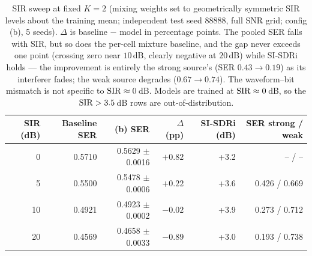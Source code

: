 \begin{table}[H]
\centering
\caption{SIR sweep at fixed $K{=}2$ (mixing weights set to geometrically symmetric SIR levels about the training mean; independent test seed 88888, full SNR grid; config (b), 5 seeds). $\Delta$ is baseline $-$ model in percentage points. The pooled SER falls with SIR, but so does the per-cell mixture baseline, and the gap never exceeds one point (crossing zero near $10$\,dB, clearly negative at $20$\,dB) while SI-SDRi holds --- the improvement is entirely the strong source's (SER $0.43 \to 0.19$) as its interferer fades; the weak source degrades ($0.67 \to 0.74$). The waveform--bit mismatch is not specific to $\mathrm{SIR} \approx 0$\,dB. Models are trained at $\mathrm{SIR} \approx 0$\,dB, so the $\mathrm{SIR} > 3.5$\,dB rows are out-of-distribution.}
\label{tab:sir_sweep}
\setlength{\tabcolsep}{4pt}
\footnotesize
\begin{tabular}{r r r r r r}
\toprule
SIR (dB) & Baseline SER & (b) SER & $\Delta$ (pp) & SI-SDRi (dB) & SER strong / weak \\
\midrule
0 & 0.5710 & 0.5629 $\pm$ 0.0016 & $+0.82$ & +3.2 & -- / -- \\
5 & 0.5500 & 0.5478 $\pm$ 0.0006 & $+0.22$ & +3.6 & 0.426 / 0.669 \\
10 & 0.4921 & 0.4923 $\pm$ 0.0002 & $-0.02$ & +3.9 & 0.273 / 0.712 \\
20 & 0.4569 & 0.4658 $\pm$ 0.0033 & $-0.89$ & +3.0 & 0.193 / 0.738 \\
\bottomrule
\end{tabular}
\end{table}
